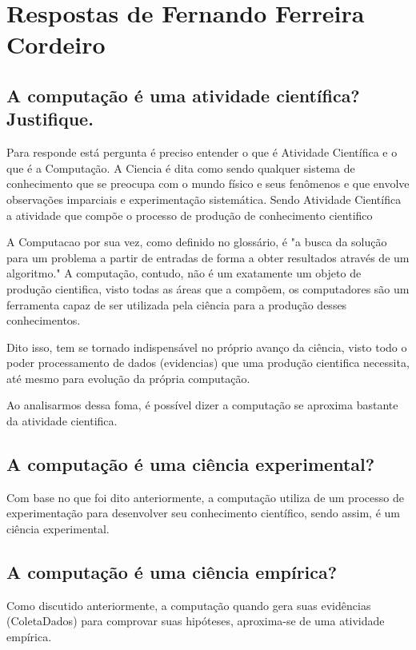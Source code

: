 \section{Respostas de Fernando Ferreira Cordeiro}


\subsection{A computação é uma atividade científica? Justifique.
}
Para responde está pergunta é preciso entender o que é Atividade Científica e o que é a Computação.
A \gls{Ciencia} é dita como sendo qualquer sistema de conhecimento que se preocupa com o mundo físico e seus fenômenos e que envolve 
observações imparciais e experimentação sistemática. Sendo Atividade Científica a atividade que compõe o processo de produção de conhecimento cientifico

A \gls{Computacao} por sua vez, como definido no glossário, é "a busca da solução para um problema a partir de entradas de forma a
obter resultados através de um algoritmo." A computação, contudo, não é um exatamente um objeto de produção cientifica, visto todas as áreas que a compõem, os computadores são um ferramenta capaz de ser utilizada pela ciência para a produção desses conhecimentos.

Dito isso, tem se tornado indispensável no próprio avanço da ciência, visto todo o poder processamento de dados (evidencias) que uma produção cientifica necessita, até mesmo para evolução da própria computação.

Ao analisarmos dessa foma, é possível dizer a computação se aproxima bastante da atividade cientifica.

\subsection{A computação é uma ciência experimental?}

Com base no que foi dito anteriormente, a computação utiliza de um processo de experimentação para desenvolver seu conhecimento científico, sendo assim, é um ciência experimental.

\subsection{A computação é uma ciência empírica?}

Como discutido anteriormente, a computação quando gera suas evidências (\gls{ColetaDados}) para comprovar suas hipóteses, aproxima-se de uma atividade empírica.